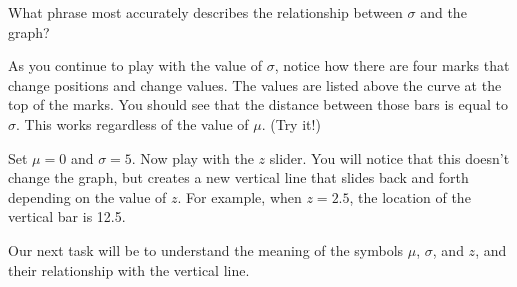 \documentclass{ximera}
\begin{document}
\begin{question}
What phrase most accurately describes the relationship between $\sigma$ and the graph?
  \begin{solution}
    \begin{multiple-choice}
    \end{multiple-choice}
  \end{solution}
\end{question}

As you continue to play with the value of $\sigma$, notice how there are four marks that change positions and change values. The values are listed above the curve at the top of the marks. You should see that the distance between those bars is equal to $\sigma$. This works regardless of the value of $\mu$. (Try it!)

Set $\mu = 0$ and $\sigma = 5$. Now play with the $z$ slider. You will notice that this doesn't change the graph, but creates a new vertical line that slides back and forth depending on the value of $z$. For example, when $z = 2.5$, the location of the vertical bar is 12.5.

Our next task will be to understand the meaning of the symbols $\mu$, $\sigma$, and $z$, and their relationship with the vertical line.
\end{document}
